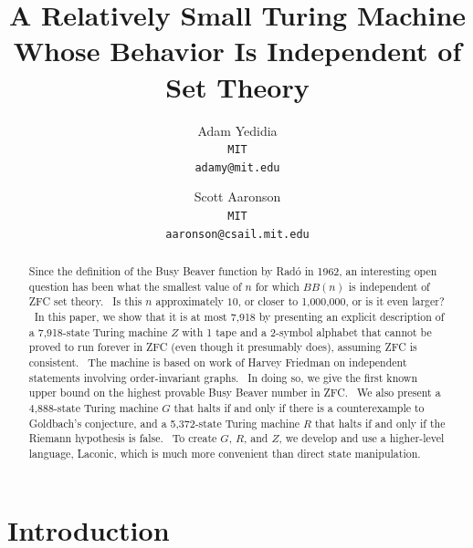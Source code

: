 \documentclass[11pt]{article}
\newcommand{\statenumstate}{7,918-state }
\newcommand{\statenum}{7,918 }
\newcommand{\gbstatenumstate}{4,888-state }
\newcommand{\rmstatenumstate}{5,372-state }
\begin{document}
\title{A Relatively Small Turing Machine Whose Behavior Is Independent of Set Theory}
\author{
    Adam Yedidia\\
    \small\texttt{MIT}\\
    \small\texttt{adamy@mit.edu}
    \and
    Scott Aaronson\\
    \small\texttt{MIT}\\
    \small\texttt{aaronson@csail.mit.edu}
}
\maketitle

\begin{abstract}

Since the definition of the Busy Beaver function by Rad\'{o} in 1962, an interesting open question has been what the smallest value of $n$ for which $BB(n)$ is independent of ZFC set theory. \ Is this $n$ approximately $10$, or closer to 1,000,000, or is it even larger? \ In this paper, we show that it is at most \statenum by presenting an explicit description of a \statenumstate Turing machine $Z$ with 1 tape and a 2-symbol alphabet that cannot be proved to run forever in ZFC (even though it presumably does), assuming ZFC is consistent. \ The machine is based on work of Harvey Friedman on independent statements involving order-invariant graphs. \ In doing so, we give the first known upper bound on the highest provable Busy Beaver number in ZFC. \ We also present a \gbstatenumstate Turing machine $G$ that halts if and only if there is a counterexample to Goldbach's conjecture, and a \rmstatenumstate Turing machine $R$ that halts if and only if the Riemann hypothesis is false. \ To create $G$, $R$, and $Z$, we develop and use a higher-level language, Laconic, which is much more convenient than direct state manipulation.

\end{abstract}

\section{Introduction}

\end{document}
